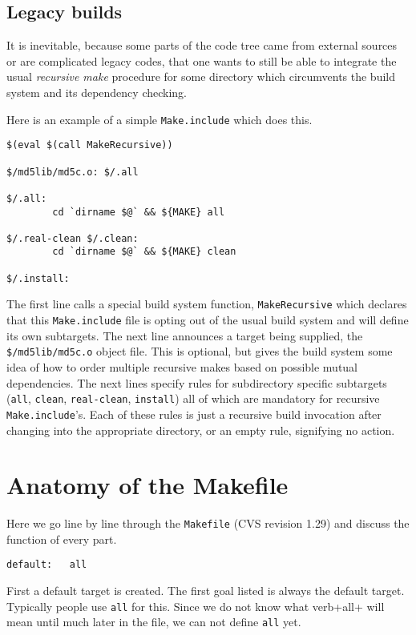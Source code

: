 \documentclass[letterpaper]{article}
\begin{document}
\subsection{Legacy builds}

It is inevitable, because some parts of the code tree
came from external sources or are complicated legacy codes, that one
wants to still be able to integrate the usual {\em recursive make}
procedure for some directory which circumvents the build system
and its dependency checking.

Here is an example of a simple \verb+Make.include+ which does this.
\begin{verbatim}
$(eval $(call MakeRecursive))

$/md5lib/md5c.o: $/.all

$/.all:
        cd `dirname $@` && ${MAKE} all

$/.real-clean $/.clean:
        cd `dirname $@` && ${MAKE} clean

$/.install:
\end{verbatim}
The first line calls a special build system function,
\verb+MakeRecursive+ which declares that this \verb+Make.include+ file
is opting out of the usual build system and will define its own
subtargets.  The next line announces a target being supplied,
the \verb+$/md5lib/md5c.o+ object file.  This is optional, but
gives the build system some idea of how to order multiple recursive
makes based on possible mutual dependencies.  The next lines specify
rules for subdirectory specific subtargets (\verb+all+, \verb+clean+,
\verb+real-clean+, \verb+install+) all of which are mandatory for
recursive \verb+Make.include+'s.  Each of these rules is just a
recursive build invocation after changing into the appropriate
directory, or an empty rule, signifying no action.


\section{Anatomy of the Makefile}

Here we go line by line through the \verb+Makefile+ (CVS revision
1.29) and discuss the function of every part.

\begin{verbatim}
default:   all
\end{verbatim}
First a default target is created.  The first goal listed is always
the default target.  Typically people use \verb+all+ for this.  Since
we do not know what verb+all+ will mean until much later in the file,
we can not define \verb+all+ yet.
\end{document}
